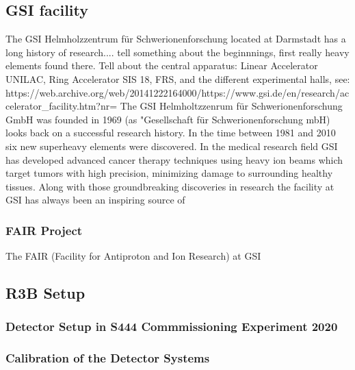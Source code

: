 \subsection{GSI facility}
The GSI Helmholzzentrum f\"ur Schwerionenforschung located at Darmstadt has a long history of research.... tell something about the beginnnings, first really heavy elements found there.\newline
Tell about the central apparatus: Linear Accelerator UNILAC, Ring Accelerator SIS 18, FRS,  and the different experimental halls, see: https://web.archive.org/web/20141222164000/https://www.gsi.de/en/research/accelerator_facility.htm?nr=%
The GSI Helmholtzzenrum f\"ur Schwerionenforschung GmbH was founded in 1969 (as "Gesellschaft f\"ur Schwerionenforschung mbH) looks back on a successful research history. In the time between 1981 and 2010 six new  superheavy elements were discovered. \newline
In the medical research field GSI has developed advanced cancer therapy techniques using heavy ion beams which target tumors with high precision, minimizing damage to surrounding healthy tissues.\newline
Along with those groundbreaking discoveries in research the facility at GSI has always been an inspiring source of  

\subsubsection{FAIR Project}
The FAIR (Facility for Antiproton and Ion Research) at GSI 
\subsection{R3B Setup}
\subsubsection{Detector Setup in S444 Commmissioning Experiment 2020}
\subsubsection{Calibration of the Detector Systems}



